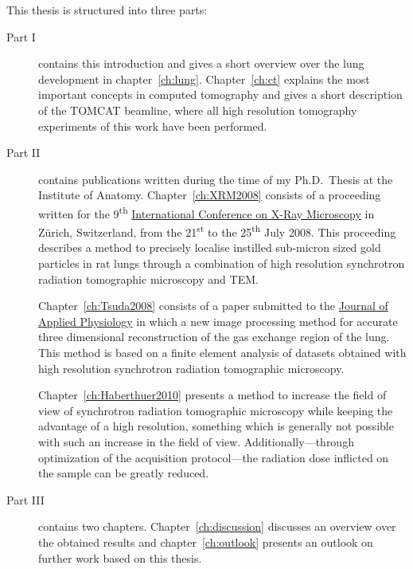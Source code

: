 This thesis is structured into three parts:
\begin{description}
	\item[Part I] contains this introduction and gives a short overview over the lung development in chapter~\ref{ch:lung}. Chapter~\ref{ch:ct} explains the most important concepts in computed tomography and gives a short description of the \acf{TOMCAT} beamline, where all high resolution tomography experiments of this work have been performed.
	\item[Part II] contains publications written during the time of my Ph.D.\ Thesis at the Institute of Anatomy. Chapter~\ref{ch:XRM2008} consists of a proceeding written for the 9\textsuperscript{th} \href{http://xrm2008.web.psi.ch/}{International Conference on X-Ray Microscopy} in Zürich, Switzerland, from the 21\textsuperscript{st} to the 25\textsuperscript{th} July 2008. This proceeding describes a method to precisely localise instilled sub-micron sized gold particles in rat lungs through a combination of high resolution synchrotron radiation tomographic microscopy and \acl{TEM}.

Chapter~\ref{ch:Tsuda2008} consists of a paper submitted to the \href{http://jap.physiology.org/}{Journal of Applied Physiology} in which a new image processing method for accurate three dimensional reconstruction of the gas exchange region of the lung. This method is based on a finite element analysis of datasets obtained with high resolution synchrotron radiation tomographic microscopy.

Chapter~\ref{ch:Haberthuer2010} presents a method to increase the field of view of synchrotron radiation tomographic microscopy while keeping the advantage of a high resolution, something which is generally not possible with such an increase in the field of view. Additionally---through optimization of the acquisition protocol---the radiation dose inflicted on the sample can be greatly reduced.

	\item[Part III] contains two chapters. Chapter~\ref{ch:discussion} discusses an overview over the obtained results and chapter~\ref{ch:outlook} presents an outlook on further work based on this thesis.
\end{description}